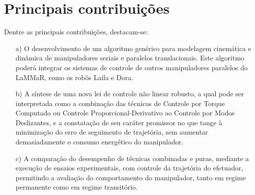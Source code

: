 \documentclass[]{politex}
\begin{document}

\section{Principais contribuições}

Dentre as principais contribuições, destacam-se:
\begin{itemize}
\item[a)] O desenvolvimento de um algoritmo genérico para modelagem cinemática e dinâmica de manipuladores seriais e paralelos translacionais. Este algoritmo poderá integrar os sistemas de controle de outros manipuladores paralelos do LaMMaR, como os robôs Laila e Dora.
\item[b)] A síntese de uma nova lei de controle não linear robusto, a qual pode ser interpretada como a combinação das técnicas de Controle por Torque Computado ou Controle Proporcional-Derivativo ao Controle por Modos Deslizantes, e a constatação de seu caráter promissor no que tange à minimização do erro de seguimento de trajetória, sem aumentar demasiadamente o consumo energético do manipulador.
\item[c)] A comparação do desempenho de técnicas combinadas e puras, mediante a execução de ensaios experimentais, com controle da trajetória do efetuador, permitindo a avaliação do comportamento do manipulador, tanto em regime permanente como em regime transitório.
\end{itemize}
\end{document}
